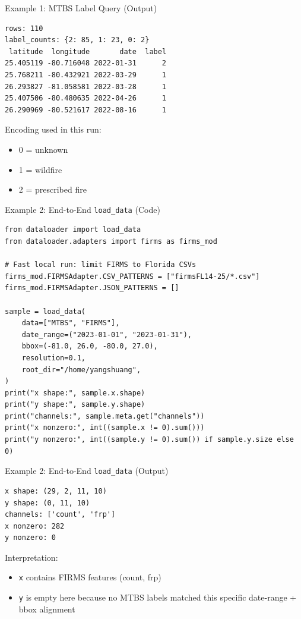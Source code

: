 \documentclass{beamer}
\begin{document}
\begin{frame}[fragile]{Example 1: MTBS Label Query (Output)}
\begin{lstlisting}[style=pycode]
rows: 110
label_counts: {2: 85, 1: 23, 0: 2}
 latitude  longitude       date  label
25.405119 -80.716048 2022-01-31      2
25.768211 -80.432921 2022-03-29      1
26.293827 -81.058581 2022-03-28      1
25.407506 -80.480635 2022-04-26      1
26.290969 -80.521617 2022-08-16      1
\end{lstlisting}
\vspace{0.3em}
Encoding used in this run:
\begin{itemize}
  \item 0 = unknown
  \item 1 = wildfire
  \item 2 = prescribed fire
\end{itemize}
\end{frame}

\begin{frame}[fragile]{Example 2: End-to-End \texttt{load\_data} (Code)}
\begin{lstlisting}[style=pycode]
from dataloader import load_data
from dataloader.adapters import firms as firms_mod

# Fast local run: limit FIRMS to Florida CSVs
firms_mod.FIRMSAdapter.CSV_PATTERNS = ["firmsFL14-25/*.csv"]
firms_mod.FIRMSAdapter.JSON_PATTERNS = []

sample = load_data(
    data=["MTBS", "FIRMS"],
    date_range=("2023-01-01", "2023-01-31"),
    bbox=(-81.0, 26.0, -80.0, 27.0),
    resolution=0.1,
    root_dir="/home/yangshuang",
)
print("x shape:", sample.x.shape)
print("y shape:", sample.y.shape)
print("channels:", sample.meta.get("channels"))
print("x nonzero:", int((sample.x != 0).sum()))
print("y nonzero:", int((sample.y != 0).sum()) if sample.y.size else 0)
\end{lstlisting}
\end{frame}

\begin{frame}[fragile]{Example 2: End-to-End \texttt{load\_data} (Output)}
\begin{lstlisting}[style=pycode]
x shape: (29, 2, 11, 10)
y shape: (0, 11, 10)
channels: ['count', 'frp']
x nonzero: 282
y nonzero: 0
\end{lstlisting}
\vspace{0.3em}
Interpretation:
\begin{itemize}
  \item \texttt{x} contains FIRMS features (count, frp)
  \item \texttt{y} is empty here because no MTBS labels matched this specific
        date-range + bbox alignment
\end{itemize}
\end{frame}
\end{document}
